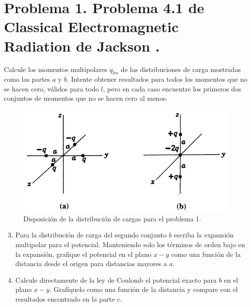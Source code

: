 \documentclass[a4paper,11pt]{article}
\numberwithin{equation}{section}
\renewcommand{\thefootnote}{\fnsymbol{footnote}}
\begin{document}

\fancyhead[R]{\thepage}

\setcounter{footnote}{0}
\renewcommand*{\thefootnote}{\arabic{footnote}}

\section{Problema 1. Problema 4.1 de Classical Electromagnetic Radiation
de Jackson \cite{jackson}.}

Calcule los momentos multipolares $q_{lm}$ de las distribuciones de carga mostradas 
como las partes $a$ y $b$. Intente obtener resultados para todos los momentos que 
no se hacen cero, válidos para todo $l$, pero en cada caso encuentre los primeros 
dos conjuntos de momentos que no se hacen cero al menos.

\begin{figure}[H]
 \center 
 \includegraphics[scale = 0.5]{problema1fig1}
 \caption{Disposición de la distribución de cargas para el problema 1.}
\end{figure}

\begin{enumerate}[label=\textbf{(\alph*)}]
\setcounter{enumi}{2}
\item Para la distribución de carga del segundo conjunto $b$ escriba la expansión 
multipolar para el potencial. Manteniendo solo los términos de orden bajo en la 
expansión, grafique el potencial en el plano $x-y$ como una función de la distancia 
desde el origen para distancias mayores a $a$.
\item Calcule directamente de la ley de Coulomb el potencial exacto para $b$ en 
el plano $x-y$. Grafíquelo como una función de la distancia y compare con el resultados
encontrado en la parte $c$.
\end{enumerate}
\end{document}
